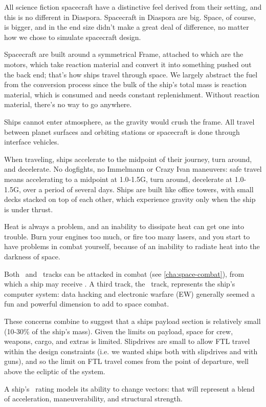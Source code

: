 \vfil

All science fiction spacecraft have a distinctive feel derived from their setting, and this is no different in Diaspora. Spacecraft in Diaspora are big. Space, of course, is bigger, and in the end size didn't make a great deal of difference, no matter how we chose to simulate spacecraft design.

Spacecraft are built around a symmetrical Frame, attached to which are the motors, which take reaction material and convert it into something pushed out the back end; that's how ships travel through space. We largely abstract the fuel from the conversion process since the bulk of the ship's total mass is reaction material, which is consumed and needs constant replenishment.  Without reaction material, there's no way to go anywhere.

Ships cannot enter atmosphere, as the gravity would crush the frame. All travel between planet surfaces and orbiting stations or spacecraft is done through interface vehicles.

When traveling, ships accelerate to the midpoint of their journey, turn around, and decelerate. No dogfights, no Immelmann or Crazy Ivan maneuvers: safe travel means accelerating to a midpoint at 1.0-1.5G, turn around, decelerate at 1.0-1.5G, over a period of several days. Ships are built like office towers, with small decks stacked on top of each other, which experience gravity only when the ship is under thrust.

Heat is always a problem, and an inability to dissipate heat can get one into trouble.  Burn your engines too much, or fire too many lasers, and you start to have problems in combat yourself, because of an inability to radiate heat into the darkness of space.


Both \Heat\ and \Frame\ tracks can be attacked in combat (see \autoref{cha:space-combat}), from which a ship may receive \Consequences. A third track, the \Data\ track, represents the ship's computer system: data hacking and electronic warfare (EW) generally seemed a fun and powerful dimension to add to space combat.

These concerns combine to suggest that a ships payload section is relatively small (10-30\% of the ship's mass). Given the limits on payload, space for crew, weapons, cargo, and extras is limited. Slipdrives are small to allow FTL travel within the design constraints (i.e. we wanted ships both with slipdrives and with guns), and so the limit on FTL travel comes from the point of departure, well above the ecliptic of the system.

A ship's \Vshift\ rating models its ability to change vectors: that will represent a blend of acceleration, maneuverability, and structural strength.

